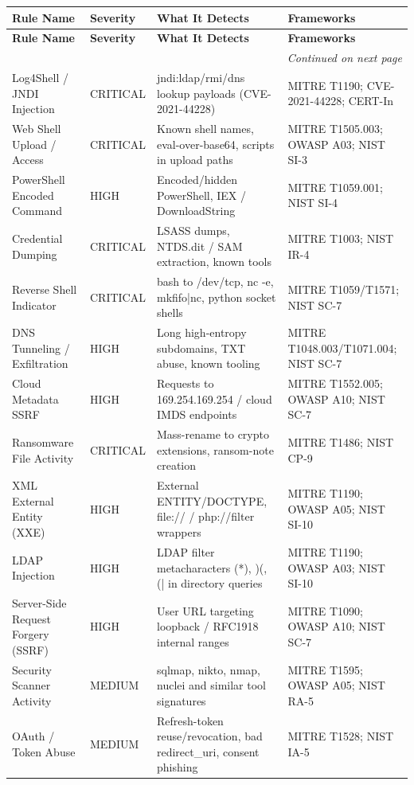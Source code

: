 \documentclass[12pt,a4paper]{article}
\begin{document}
\begin{longtable}{|p{4.2cm}|p{1.9cm}|p{4.6cm}|p{4.2cm}|}
\hline
\textbf{Rule Name} & \textbf{Severity} & \textbf{What It Detects} & \textbf{Frameworks} \\
\hline
\endfirsthead
\hline
\textbf{Rule Name} & \textbf{Severity} & \textbf{What It Detects} & \textbf{Frameworks} \\
\hline
\endhead
\hline
\multicolumn{4}{|r|}{\textit{Continued on next page}} \\
\hline
\endfoot
\hline
\endlastfoot
Log4Shell / JNDI Injection & CRITICAL & jndi:ldap/rmi/dns lookup payloads (CVE-2021-44228) & MITRE T1190; CVE-2021-44228; CERT-In \\
\hline
Web Shell Upload / Access & CRITICAL & Known shell names, eval-over-base64, scripts in upload paths & MITRE T1505.003; OWASP A03; NIST SI-3 \\
\hline
PowerShell Encoded Command & HIGH & Encoded/hidden PowerShell, IEX / DownloadString & MITRE T1059.001; NIST SI-4 \\
\hline
Credential Dumping & CRITICAL & LSASS dumps, NTDS.dit / SAM extraction, known tools & MITRE T1003; NIST IR-4 \\
\hline
Reverse Shell Indicator & CRITICAL & bash to /dev/tcp, nc -e, mkfifo|nc, python socket shells & MITRE T1059/T1571; NIST SC-7 \\
\hline
DNS Tunneling / Exfiltration & HIGH & Long high-entropy subdomains, TXT abuse, known tooling & MITRE T1048.003/T1071.004; NIST SC-7 \\
\hline
Cloud Metadata SSRF & HIGH & Requests to 169.254.169.254 / cloud IMDS endpoints & MITRE T1552.005; OWASP A10; NIST SC-7 \\
\hline
Ransomware File Activity & CRITICAL & Mass-rename to crypto extensions, ransom-note creation & MITRE T1486; NIST CP-9 \\
\hline
XML External Entity (XXE) & HIGH & External ENTITY/DOCTYPE, file:// / php://filter wrappers & MITRE T1190; OWASP A05; NIST SI-10 \\
\hline
LDAP Injection & HIGH & LDAP filter metacharacters (*), )(, (| in directory queries & MITRE T1190; OWASP A03; NIST SI-10 \\
\hline
Server-Side Request Forgery (SSRF) & HIGH & User URL targeting loopback / RFC1918 internal ranges & MITRE T1090; OWASP A10; NIST SC-7 \\
\hline
Security Scanner Activity & MEDIUM & sqlmap, nikto, nmap, nuclei and similar tool signatures & MITRE T1595; OWASP A05; NIST RA-5 \\
\hline
OAuth / Token Abuse & MEDIUM & Refresh-token reuse/revocation, bad redirect\_uri, consent phishing & MITRE T1528; NIST IA-5 \\
\hline
\end{longtable}
\newpage
\end{document}
